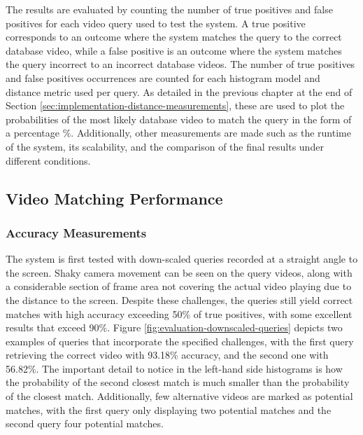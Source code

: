 The results are evaluated by counting the number of true positives and false positives for each video query used to test the system. A true positive corresponds to an outcome where the system matches the query to the correct database video, while a false positive is an outcome where the system matches the query incorrect to an incorrect database videos. The number of true positives and false positives occurrences are counted for each histogram model and distance metric used per query. As detailed in the previous chapter at the end of Section \ref{sec:implementation-distance-measurements}, these are used to plot the probabilities of the most likely database video to match the query in the form of a percentage \%. Additionally, other measurements are made such as the runtime of the system, its scalability, and the comparison of the final results under different conditions.


\subsection{Video Matching Performance}

\subsubsection{Accuracy Measurements}

The system is first tested with down-scaled queries recorded at a straight angle to the screen. Shaky camera movement can be seen on the query videos, along with a considerable section of frame area not covering the actual video playing due to the distance to the screen. Despite these challenges, the queries still yield correct matches with high accuracy exceeding 50\% of true positives, with some excellent results that exceed 90\%. Figure \ref{fig:evaluation-downscaled-queries} depicts two examples of queries that incorporate the specified challenges, with the first query retrieving the correct video with 93.18\% accuracy, and the second one with 56.82\%. The important detail to notice in the left-hand side histograms is how the probability of the second closest match is much smaller than the probability of the closest match. Additionally, few alternative videos are marked as potential matches, with the first query only displaying two potential matches and the second query four potential matches. %

